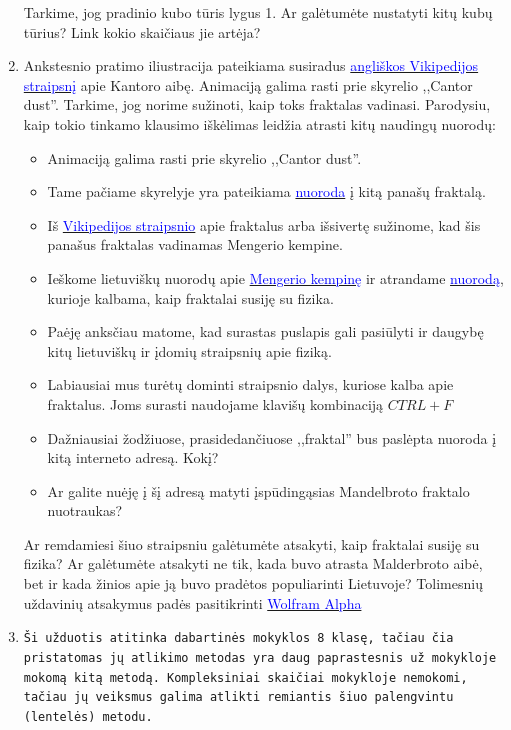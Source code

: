 \documentclass[a4paper]{article}
\renewenvironment{framed}[1][\hsize]
   {\MakeFramed{\hsize#1\advance\hsize-\width \FrameRestore}}%
   {\endMakeFramed}
\newcommand{\goto}[2]{\href{\detokenize{#1}}{\textcolor{blue}{#2}}}
\begin{document}
\begin{enumerate}
Tarkime, jog pradinio kubo tūris lygus 1. Ar galėtumėte nustatyti kitų kubų tūrius? Link kokio skaičiaus jie artėja?

\item Ankstesnio pratimo iliustracija pateikiama susiradus \goto{https://en.wikipedia.org/wiki/Cantor_set}{angliškos Vikipedijos straipsnį} apie Kantoro aibę. Animaciją galima rasti prie skyrelio ,,Cantor dust''. Tarkime, jog norime sužinoti, kaip toks fraktalas vadinasi. Parodysiu, kaip tokio tinkamo klausimo iškėlimas leidžia atrasti kitų naudingų nuorodų:
\begin{itemize}
\item Animaciją galima rasti prie skyrelio ,,Cantor dust''.
\item Tame pačiame skyrelyje yra pateikiama \goto{https://en.wikipedia.org/wiki/Menger_sponge}{nuoroda} į kitą panašų fraktalą.
\item Iš \goto{https://lt.wikipedia.org/wiki/Fraktalas}{Vikipedijos straipsnio} apie fraktalus arba išsivertę sužinome, kad šis panašus fraktalas vadinamas Mengerio kempine.
\item Ieškome lietuviškų nuorodų apie \href{https://www.google.com/search?q=Mengerio+kempinė\&client=firefox-b-d\&tbm=isch\&source=iu\&ictx=1\&fir=qZ0c-n7YPwP1vM\%253A\%252CqvsowJzBeRJm6M\%252C\_\&vet=1\&usg=AI4\_-kR0ZwupJegAUepmi4xwgf3oq4zEkg\&sa=X\&ved=2ahUKEwj\_i7-ejbjhAhWMo4sKHTDbDSEQ9QEwA3oECCAQCA\#imgrc=Fn0oWIjjZCnT7M:\&vet=1}{\textcolor{blue}{Mengerio kempinę}} ir atrandame \goto{http://www.nso.lt/science/self-quant.htm}{nuorodą}, kurioje kalbama, kaip fraktalai susiję su fizika.
\item Paėję anksčiau matome, kad surastas puslapis gali pasiūlyti ir daugybę kitų lietuviškų ir įdomių straipsnių apie fiziką.
\item Labiausiai mus turėtų dominti straipsnio dalys, kuriose kalba apie fraktalus. Joms surasti naudojame klavišų kombinaciją $CTRL + F$
\item Dažniausiai žodžiuose, prasidedančiuose ,,fraktal'' bus paslėpta nuoroda į kitą interneto adresą. Kokį?
\item Ar galite nuėję į šį adresą matyti įspūdingąsias Mandelbroto fraktalo nuotraukas?
\end{itemize}
Ar remdamiesi šiuo straipsniu galėtumėte atsakyti, kaip fraktalai susiję su fizika? Ar galėtumėte atsakyti ne tik, kada buvo atrasta Malderbroto aibė, bet ir kada žinios apie ją buvo pradėtos populiarinti Lietuvoje?
\begin{framed}
Tolimesnių uždavinių atsakymus padės pasitikrinti \goto{https://www.wolframalpha.com/input/?i=(x-sqrt(2019))(x\%2Bsqrt(2019))}{Wolfram Alpha}
\end{framed}
\item \texttt{Ši užduotis atitinka dabartinės mokyklos 8 klasę, tačiau čia pristatomas jų atlikimo metodas yra daug paprastesnis už mokykloje mokomą kitą metodą. Kompleksiniai skaičiai mokykloje nemokomi, tačiau jų veiksmus galima atlikti remiantis šiuo palengvintu (lentelės) metodu.}


\end{enumerate}
\end{document}
